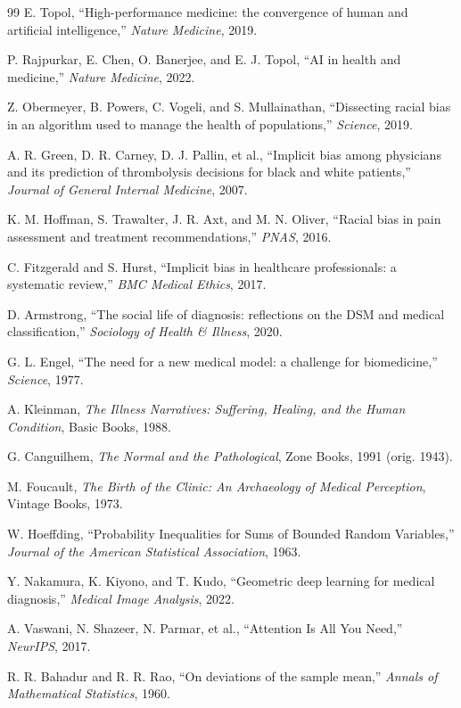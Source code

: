\documentclass[12pt,a4paper]{article}
\theoremstyle{remark}
\begin{document}
\begin{thebibliography}{99}
E. Topol,
``High-performance medicine: the convergence of human and artificial intelligence,''
\textit{Nature Medicine}, 2019.

P. Rajpurkar, E. Chen, O. Banerjee, and E. J. Topol,
``AI in health and medicine,''
\textit{Nature Medicine}, 2022.

Z. Obermeyer, B. Powers, C. Vogeli, and S. Mullainathan,
``Dissecting racial bias in an algorithm used to manage the health of populations,''
\textit{Science}, 2019.

A. R. Green, D. R. Carney, D. J. Pallin, et al.,
``Implicit bias among physicians and its prediction of thrombolysis decisions for black and white patients,''
\textit{Journal of General Internal Medicine}, 2007.

K. M. Hoffman, S. Trawalter, J. R. Axt, and M. N. Oliver,
``Racial bias in pain assessment and treatment recommendations,''
\textit{PNAS}, 2016.

C. Fitzgerald and S. Hurst,
``Implicit bias in healthcare professionals: a systematic review,''
\textit{BMC Medical Ethics}, 2017.

D. Armstrong,
``The social life of diagnosis: reflections on the DSM and medical classification,''
\textit{Sociology of Health \& Illness}, 2020.

G. L. Engel,
``The need for a new medical model: a challenge for biomedicine,''
\textit{Science}, 1977.

A. Kleinman,
\textit{The Illness Narratives: Suffering, Healing, and the Human Condition},
Basic Books, 1988.

G. Canguilhem,
\textit{The Normal and the Pathological},
Zone Books, 1991 (orig. 1943).

M. Foucault,
\textit{The Birth of the Clinic: An Archaeology of Medical Perception},
Vintage Books, 1973.

W. Hoeffding,
``Probability Inequalities for Sums of Bounded Random Variables,''
\textit{Journal of the American Statistical Association}, 1963.

Y. Nakamura, K. Kiyono, and T. Kudo,
``Geometric deep learning for medical diagnosis,''
\textit{Medical Image Analysis}, 2022.

A. Vaswani, N. Shazeer, N. Parmar, et al.,
``Attention Is All You Need,''
\textit{NeurIPS}, 2017.

R. R. Bahadur and R. R. Rao,
``On deviations of the sample mean,''
\textit{Annals of Mathematical Statistics}, 1960.

\end{thebibliography}
\end{document}
